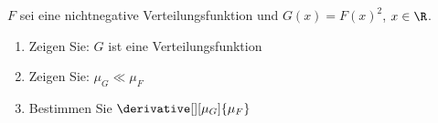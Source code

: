 
\begin{exercise}

$F$ sei eine nichtnegative Verteilungsfunktion und $G(x) = F(x)^2$, $x \in \R$.

\begin{enumerate}[label = (\alph*)]

    \item Zeigen Sie:
    $G$ ist eine Verteilungsfunktion

    \item Zeigen Sie:
    $\mu_G \ll \mu_F$

    \item Bestimmen Sie $\derivative[][\mu_G]{\mu_F}$

\end{enumerate}

\end{exercise}


